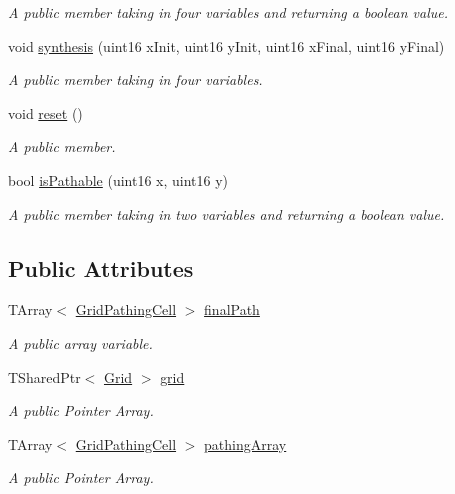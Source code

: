 \begin{DoxyCompactItemize}
\begin{DoxyCompactList}\small\item\em A public member taking in four variables and returning a boolean value. \end{DoxyCompactList}\item 
void \hyperlink{class_grid_pathing_a1cad627b7af6d693e2b6fbabae4a54cc}{synthesis} (uint16 x\+Init, uint16 y\+Init, uint16 x\+Final, uint16 y\+Final)
\begin{DoxyCompactList}\small\item\em A public member taking in four variables. \end{DoxyCompactList}\item 
void \hyperlink{class_grid_pathing_aa4ce89d949c8d42bf2d4eb9d77e865a8}{reset} ()
\begin{DoxyCompactList}\small\item\em A public member. \end{DoxyCompactList}\item 
bool \hyperlink{class_grid_pathing_a037817191233010bfb337e78142583b3}{is\+Pathable} (uint16 x, uint16 y)
\begin{DoxyCompactList}\small\item\em A public member taking in two variables and returning a boolean value. \end{DoxyCompactList}\end{DoxyCompactItemize}
\subsection*{Public Attributes}
\begin{DoxyCompactItemize}
\item 
T\+Array$<$ \hyperlink{class_grid_pathing_cell}{Grid\+Pathing\+Cell} $>$ \hyperlink{class_grid_pathing_a5f136ffddfd481828d8e3bd4bd68c469}{final\+Path}
\begin{DoxyCompactList}\small\item\em A public array variable. \end{DoxyCompactList}\item 
T\+Shared\+Ptr$<$ \hyperlink{class_grid}{Grid} $>$ \hyperlink{class_grid_pathing_a7dd028322c2248c079d5c9aff06389e3}{grid}
\begin{DoxyCompactList}\small\item\em A public Pointer Array. \end{DoxyCompactList}\item 
T\+Array$<$ \hyperlink{class_grid_pathing_cell}{Grid\+Pathing\+Cell} $>$ \hyperlink{class_grid_pathing_abe2319f19bada22c1a20e5ae544b1ed2}{pathing\+Array}
\begin{DoxyCompactList}\small\item\em A public Pointer Array. \end{DoxyCompactList}\end{DoxyCompactItemize}


